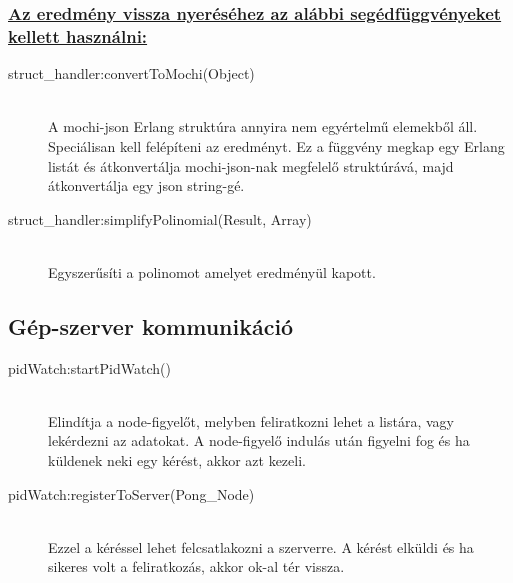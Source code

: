 	\subsubsection{\underline{Az eredmény vissza nyeréséhez az alábbi segédfüggvényeket kellett használni:}}
	\begin{description}
	
		\item[struct\_handler:convertToMochi(Object)] \hfill \\ 
		A mochi-json Erlang struktúra annyira nem egyértelmű elemekből áll. Speciálisan kell felépíteni az eredményt. Ez a függvény megkap egy Erlang listát és átkonvertálja mochi-json-nak megfelelő struktúrává, majd átkonvertálja egy json string-gé.

		\item[struct\_handler:simplifyPolinomial(Result, Array) ] \hfill \\ 
		Egyszerűsíti a polinomot amelyet eredményül kapott.
	
	\end{description}
\subsection{Gép-szerver kommunikáció}
	\begin{description}
	\item[pidWatch:startPidWatch()]
	\hfill \\ Elindítja a node-figyelőt, melyben feliratkozni lehet a listára, vagy lekérdezni az adatokat. A node-figyelő indulás után figyelni fog és ha küldenek neki egy kérést, akkor azt kezeli. 
	\item[pidWatch:registerToServer(Pong\_Node)]
	\hfill \\ Ezzel a kéréssel lehet felcsatlakozni a szerverre. A kérést elküldi és ha sikeres volt a feliratkozás, akkor ok-al tér vissza.
	\end{description}
